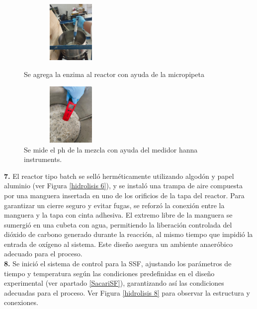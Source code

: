 \documentclass[12pt]{article}
\begin{document}
	     \begin{figure}[H]
	     	\centering
	     	\begin{minipage}{0.46\textwidth}
	     		\centering
	     		\includegraphics[width=5cm, height=3cm]{imagenes/hidrolisis9} %
	     		\caption{ Se agrega la enzima al reactor con ayuda de la micropipeta }
	     		\label{hidrolisis9}
	     	\end{minipage}
	     	\hfill
	     	\begin{minipage}{0.48\textwidth}
	     		\centering
	     		\includegraphics[width=5cm, height=3cm]{imagenes/hidrolisis3 } %
	     		\caption{ Se mide el ph de la mezcla con ayuda del medidor hanna instruments.}
	     		\label{hidrolisis3}
	     	\end{minipage}
	     \end{figure}
	     
	      \textbf{7.} El reactor tipo batch se selló herméticamente utilizando algodón y papel aluminio (ver Figura \ref{hidrolisis 6}), y se instaló una trampa de aire compuesta por una manguera insertada en uno de los orificios de la tapa del reactor. Para garantizar un cierre seguro y evitar fugas, se reforzó la conexión entre la manguera y la tapa con cinta adhesiva. El extremo libre de la manguera se sumergió en una cubeta con agua, permitiendo la liberación controlada del dióxido de carbono generado durante la reacción, al mismo tiempo que impidió la entrada de oxígeno al sistema. Este diseño asegura un ambiente anaeróbico adecuado para el proceso.
	      \\[0.5em]
	     
	     	\textbf{8.} Se inició el sistema de control para la SSF, ajustando los parámetros de tiempo y temperatura según las condiciones predefinidas en el diseño experimental (ver apartado \ref{SacariSF}), garantizando así las condiciones adecuadas para el proceso. Ver Figura \ref{hidrolisis 8} para observar la estructura y conexiones.
	     	
\end{document}
